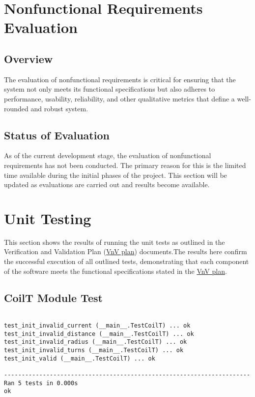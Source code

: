 \documentclass[12pt, titlepage]{article}
\begin{document}
\section{Nonfunctional Requirements Evaluation}

\subsection{Overview}
The evaluation of nonfunctional requirements is critical for ensuring that the system not only meets its functional specifications but also adheres to performance, usability, reliability, and other qualitative metrics that define a well-rounded and robust system. 

\subsection{Status of Evaluation}
As of the current development stage, the evaluation of nonfunctional requirements has not been conducted. The primary reason for this is the limited time available during the initial phases of the project. This section will be updated as evaluations are carried out and results become available.


\section{Unit Testing}

This section shows the results of running the unit tests as outlined in the Verification and Validation Plan (\href{https://github.com/rnorouziani/3D-H3C/blob/main/docs/VnVPlan/VnVPlan.pdf}{VnV plan}) documents.The results here confirm the successful execution of all outlined tests, demonstrating that each component of the software meets the functional specifications stated in the \href{https://github.com/rnorouziani/3D-H3C/blob/main/docs/VnVPlan/VnVPlan.pdf}{VnV plan}.


\subsection{CoilT Module Test}
\begin{small}
\begin{verbatim}

test_init_invalid_current (__main__.TestCoilT) ... ok
test_init_invalid_distance (__main__.TestCoilT) ... ok
test_init_invalid_radius (__main__.TestCoilT) ... ok
test_init_invalid_turns (__main__.TestCoilT) ... ok
test_init_valid (__main__.TestCoilT) ... ok

----------------------------------------------------------------------
Ran 5 tests in 0.000s
ok

\end{verbatim}
\end{small}
\end{document}
